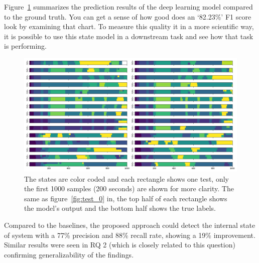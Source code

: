 Figure~\ref{fig:paparazzi_predictions} summarizes the prediction results of the deep learning model compared to the ground truth. You can get a sense of how good does an `82.23\%' F1 score look by examining that chart. To measure this quality it in a more scientific way, it is possible to use this state model in a downstream task and see how that task is performing.
\begin{figure}
    \centering
    \includegraphics[width=\columnwidth]{RQ3-5_charts/states_chart.png}
    \caption{The states are color coded and each rectangle shows one test, only the first 1000 samples (200 seconds) are shown for more clarity. The same as figure~\ref{fig:test_0} in, the top half of each rectangle shows the model's output and the bottom half shows the true labels.}
    \label{fig:paparazzi_predictions}
\end{figure}


\begin{rqanswer}
Compared to the baselines, the proposed approach could detect the internal state of system with a 77\% precision and 88\% recall rate, showing a 19\% improvement. Similar results were seen in RQ 2 (which is closely related to this question) confirming generalizability of the findings.
\end{rqanswer}

